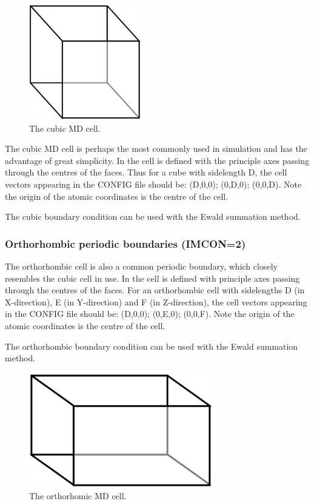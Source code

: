 \begin{figure}[ht]
\begin{center}
\includegraphics[height=5cm]{cube.ps}
\caption{The cubic MD cell.}
\end{center}
\end{figure}

The cubic MD cell is perhaps the most commonly used in simulation and
has the advantage of great simplicity. In \D{} the cell is defined with
the principle axes passing through the centres of the faces.  Thus for
a cube with sidelength D, the cell vectors appearing in the CONFIG
file should be: (D,0,0); (0,D,0); (0,0,D). Note the origin of the
atomic coordinates is the centre of the cell.

The cubic boundary condition can be used with the Ewald summation
method.

\subsubsection*{Orthorhombic periodic boundaries (IMCON=2)}
The orthorhombic cell is also a common periodic boundary, which
closely resembles the cubic cell in use. In \D{} the cell is defined
with principle axes passing through the centres of the faces.  For an
orthorhombic cell with sidelengths D (in X-direction), E (in
Y-direction) and F (in Z-direction), the cell vectors appearing in the
CONFIG file should be: (D,0,0); (0,E,0); (0,0,F). Note the origin of
the atomic coordinates is the centre of the cell.


The orthorhombic boundary condition can be used with the Ewald summation
method.

\begin{figure}[ht]
\begin{center}
\includegraphics[height=5cm]{ortho.ps}
\caption{The orthorhomic MD cell.}
\end{center}
\end{figure}

